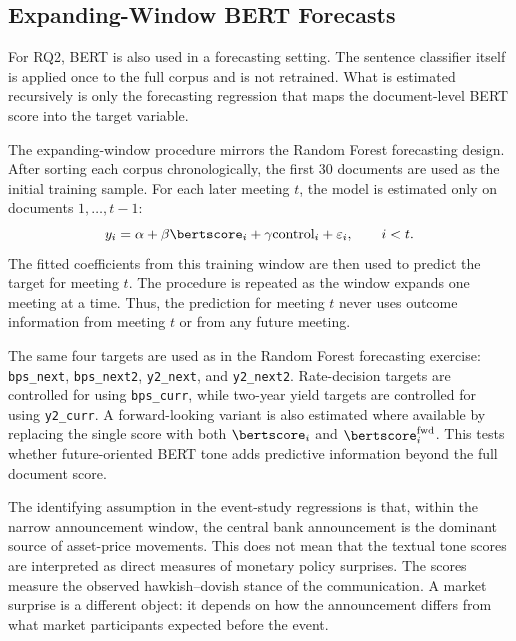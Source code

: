 \subsection{Expanding-Window BERT Forecasts}
\label{sec:meth_bert_xw}

For RQ2, BERT is also used in a forecasting setting. The sentence
classifier itself is applied once to the full corpus and is not
retrained. What is estimated recursively is only the forecasting
regression that maps the document-level BERT score into the target
variable.

The expanding-window procedure mirrors the Random Forest forecasting
design. After sorting each corpus chronologically, the first
30 documents are used as the initial training sample. For each later
meeting \(t\), the model is estimated only on documents
\(1,\dots,t-1\):
%
\begin{equation}
\label{eq:bert_xw_forecast}
y_i
=
\alpha
+
\beta \bertscore_i
+
\gamma \text{control}_i
+
\varepsilon_i,
\qquad i < t.
\end{equation}
%
The fitted coefficients from this training window are then used to
predict the target for meeting \(t\). The procedure is repeated as the
window expands one meeting at a time. Thus, the prediction for meeting
\(t\) never uses outcome information from meeting \(t\) or from any
future meeting.

The same four targets are used as in the Random Forest forecasting
exercise: \texttt{bps\_next}, \texttt{bps\_next2}, \texttt{y2\_next},
and \texttt{y2\_next2}. Rate-decision targets are controlled for using
\texttt{bps\_curr}, while two-year yield targets are controlled for
using \texttt{y2\_curr}. A forward-looking variant is also estimated
where available by replacing the single score with both
\(\bertscore_i\) and \(\bertscore^{\text{fwd}}_i\). This tests whether
future-oriented BERT tone adds predictive information beyond the full
document score.

\label{sec:meth_identification}

The identifying assumption in the event-study regressions is that, within
the narrow announcement window, the central bank announcement is the
dominant source of asset-price movements. This does not mean that the
textual tone scores are interpreted as direct measures of monetary policy
surprises. The scores measure the observed hawkish--dovish stance of the
communication. A market surprise is a different object: it depends on how
the announcement differs from what market participants expected before
the event.

